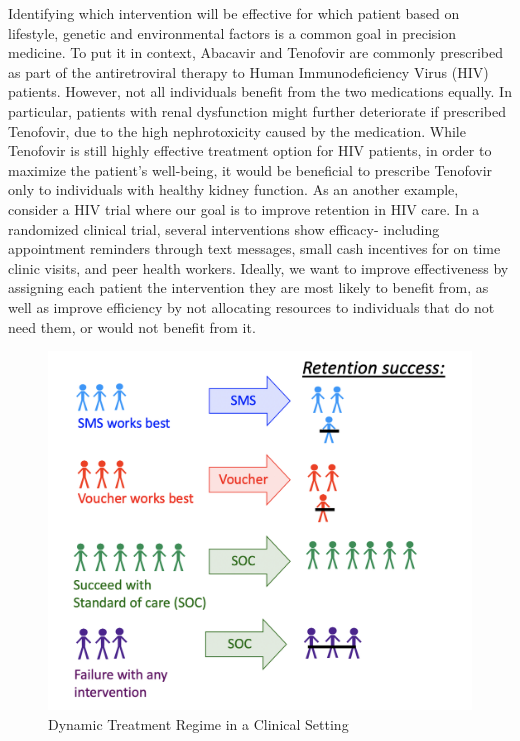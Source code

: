 \documentclass[
  12pt, krantz2,
]{krantz}
\newcommand{\1}{\mathbbm{1}}
\theoremstyle{definition}
\theoremstyle{definition}
\theoremstyle{definition}
\theoremstyle{definition}
\theoremstyle{remark}
\begin{document}
Identifying which intervention will be effective for which patient based on
lifestyle, genetic and environmental factors is a common goal in precision
medicine. To put it in context, Abacavir and Tenofovir are commonly prescribed
as part of the antiretroviral therapy to Human Immunodeficiency Virus (HIV)
patients. However, not all individuals benefit from the two medications equally.
In particular, patients with renal dysfunction might further deteriorate if
prescribed Tenofovir, due to the high nephrotoxicity caused by the medication.
While Tenofovir is still highly effective treatment option for HIV patients, in
order to maximize the patient's well-being, it would be beneficial to prescribe
Tenofovir only to individuals with healthy kidney function. As an another example,
consider a HIV trial where our goal is to improve retention in HIV care.
In a randomized clinical trial, several interventions show efficacy- including
appointment reminders through text messages, small cash incentives for on time
clinic visits, and peer health workers. Ideally, we want to improve effectiveness
by assigning each patient the intervention they are most likely to benefit from,
as well as improve efficiency by not allocating resources to individuals that do not need
them, or would not benefit from it.

\begin{figure}

{\centering \includegraphics[width=0.8\linewidth]{img/png/DynamicA_Illustration} 

}

\caption{Dynamic Treatment Regime in a Clinical Setting}\label{fig:unnamed-chunk-1}
\end{figure}
\end{document}
